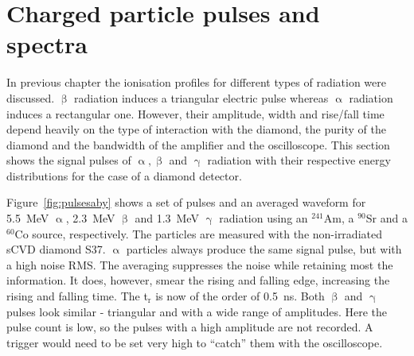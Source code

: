 \section{Charged particle pulses and spectra}
\label{sec:pulsespectra}
In previous chapter the ionisation profiles for different types of radiation were discussed. $\upbeta$ radiation induces a triangular electric pulse whereas $\upalpha$ radiation induces a rectangular one. However, their amplitude, width and rise/fall time depend heavily on the type of interaction with the diamond, the purity of the diamond and the bandwidth of the amplifier and the oscilloscope. This section shows the signal pulses of $\upalpha, \upbeta$ and $\upgamma$ radiation with their respective energy distributions for the case of a diamond detector. %

Figure~\ref{fig:pulsesaby} shows a set of pulses and an averaged waveform for 5.5~MeV $\upalpha$, 2.3~MeV $\upbeta$ and 1.3~MeV $\upgamma$ radiation using an $^{241}$Am, a $^{90}$Sr and a $^{60}$Co source, respectively. The particles are measured with the non-irradiated sCVD diamond S37. $\upalpha$ particles always produce the same signal pulse, but with a high noise RMS. The averaging suppresses the noise while retaining most the information. It does, however, smear the rising and falling edge, increasing the rising and falling time. The t$_{\mathrm{r}}$ is now of the order of 0.5~ns. Both $\upbeta$ and $\upgamma$ pulses look similar - triangular and with a wide range of amplitudes. Here the pulse count is low, so the pulses with a high amplitude are not recorded. A trigger would need to be set very high to ``catch'' them with the oscilloscope.

